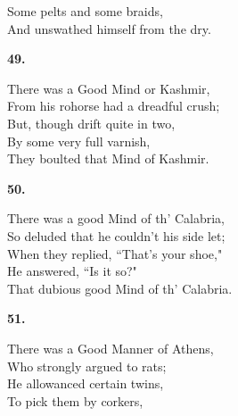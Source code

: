 \documentclass{book}
\begin{document}
{\hspace*{14mm}       Some pelts and some braids, \\
\hspace*{14mm}       And unswathed himself from the dry.
\begin{center}
\textbf{    49.}
\end{center}
\par
\noindent
\hspace*{14mm}       There was a Good Mind or Kashmir, \\
\hspace*{14mm}       From his rohorse had a dreadful crush; \\
\hspace*{14mm}       But, though drift quite in two, \\
\hspace*{14mm}       By some very full varnish, \\
\hspace*{14mm}       They boulted that Mind of Kashmir.
\begin{center}
\textbf{    50.}
\end{center}
\par
\noindent
\hspace*{14mm}       There was a good Mind of th' Calabria, \\
\hspace*{14mm}       So deluded that he couldn't his side let; \\
\hspace*{14mm}       When they replied, ``That's your shoe," \\
\hspace*{14mm}       He answered, ``Is it so?" \\
\hspace*{14mm}       That dubious good Mind of th' Calabria.
\begin{center}
\textbf{    51.}
\end{center}
\par
\noindent
\hspace*{14mm}       There was a Good Manner of Athens, \\
\hspace*{14mm}       Who strongly argued to rats; \\
\hspace*{14mm}       He allowanced certain twins, \\
\hspace*{14mm}       To pick them by corkers, \\
}
\end{document}
